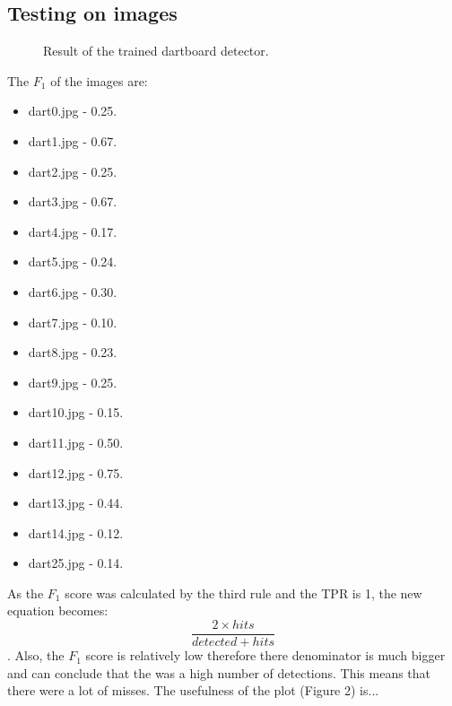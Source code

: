 \documentclass[a4paper]{article}
\begin{document}
\subsection{Testing on images}

\begin{figure}[H]
  \centering
  \hfill
   \hfill
   \hfill
   \hfill
   \caption{Result of the trained dartboard detector.}
\end{figure}

The \(F_{1}\) of the images are:
\begin{multicols}{4}
    \begin{itemize}
		\item dart0.jpg - 0.25.
        \item dart1.jpg - 0.67.
        \item dart2.jpg - 0.25.
        \item dart3.jpg - 0.67.
        \item dart4.jpg - 0.17.
        \item dart5.jpg - 0.24.
        \item dart6.jpg - 0.30.
        \item dart7.jpg - 0.10.
        \item dart8.jpg - 0.23.
        \item dart9.jpg - 0.25.
        \item dart10.jpg - 0.15.
        \item dart11.jpg - 0.50.
        \item dart12.jpg - 0.75.
        \item dart13.jpg - 0.44.
        \item dart14.jpg - 0.12.
        \item dart25.jpg - 0.14.
    \end{itemize}
\end{multicols}

As the \(F_{1}\) score was calculated by the third rule and the TPR is 1, the new equation becomes: \[\frac{2 \times hits}{detected + hits}\]. Also, the \(F_{1}\) score is relatively low therefore there denominator is much bigger and can conclude that the was a high number of detections. This means that there were a lot of misses. The usefulness of the plot (Figure 2) is...
\end{document}
